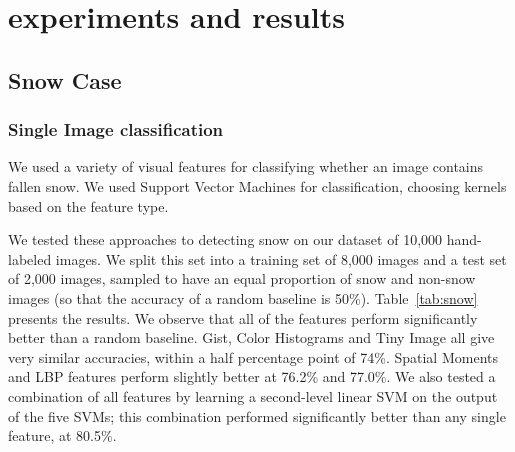 \documentclass[10pt,journal,compsoc]{IEEEtran}
\begin{document}






\section{experiments and results}
\label{sec:experiments}





\subsection{Snow Case}

\subsubsection{Single Image classification}

We used a variety of  visual features  for classifying
whether an image contains fallen snow. We used Support Vector
Machines for classification, choosing kernels based on the feature
type. 

We tested these approaches to detecting snow on our dataset of
10,000 hand-labeled images. We split this set into a training set of
8,000 images and a test set of 2,000 images, sampled to have an
 equal proportion of snow and non-snow images (so
that the accuracy of a random baseline is 50\%).
Table~\ref{tab:snow} presents the results. We observe that all of the
features perform significantly better than a random baseline. 
Gist, Color Histograms and Tiny Image all give very similar accuracies, within a half
percentage point of 74\%. Spatial Moments and
LBP  features perform
slightly better at 76.2\% and 77.0\%. We also tested a combination of all 
features by learning a second-level linear SVM on the output of the
five SVMs; this combination performed significantly better than any single feature,
at 80.5\%.
\end{document}
